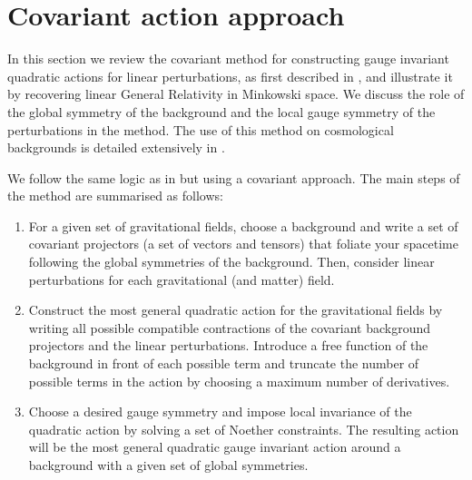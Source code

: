 \documentclass[10pt,twocolumn,preprintnumbers,amsmath,amssymb,nofootinbib
,superscriptaddress]{revtex4-1}
\begin{document}
\section{Covariant action approach}\label{SecFP}
In this section we review the covariant method for constructing gauge invariant quadratic actions for linear perturbations, as first described in \cite{Tattersall:2017eav}, and illustrate it by recovering linear General Relativity in Minkowski space. We discuss the role of the global symmetry of the background and the local gauge symmetry of the perturbations in the method. The use of this method on cosmological backgrounds is detailed extensively in \cite{Tattersall:2017eav}.

We follow the same logic as in \cite{Lagos:2016wyv,2017JCAP...01..047L} but using a covariant approach. The main steps of the method are summarised as follows: 
\begin{enumerate}
\item For a given set of gravitational fields, choose a background and write a set of covariant projectors (a set of vectors and tensors) that foliate your spacetime following the global symmetries of the background. Then, consider linear perturbations for each gravitational (and matter) field.

\item Construct the most general quadratic action for the gravitational fields by writing all possible compatible contractions of the covariant background projectors and the linear perturbations. Introduce a free function of the background in front of each possible term and truncate the number of possible terms in the action by choosing a maximum number of derivatives.

\item Choose a desired gauge symmetry and impose local invariance of the quadratic action by solving a set of Noether constraints. The resulting action will be the most general quadratic gauge invariant action around a background with a given set of global symmetries. 

\end{enumerate} 
\end{document}
